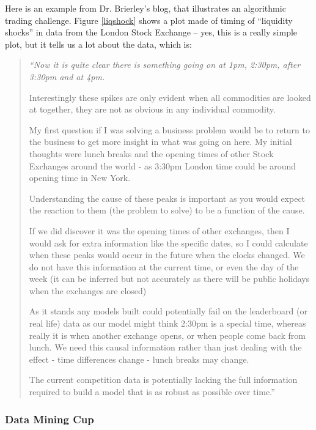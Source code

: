 \documentclass{article}
\begin{document}
Here is an example from Dr. Brierley's blog, that illustrates an algorithmic trading challenge. Figure \ref{liqshock} shows a plot made of timing of ``liquidity shocks'' in data from the London Stock Exchange -- yes, this is a really simple plot, but it tells us a lot about the data, which is:

\begin{quote}
{\em ``Now it is quite clear there is something going on at 1pm, 2:30pm, after 3:30pm and at 4pm.

Interestingly these spikes are only evident when all commodities are looked at together, they are not as obvious in any individual commodity.

My first question if I was solving a business problem would be to return to the business to get more insight in what was going on here. My initial thoughts were lunch breaks and the opening times of other Stock Exchanges around the world - as 3:30pm London time could be around opening time in New York.

Understanding the cause of these peaks is important as you would expect the reaction to them (the problem to solve) to be a function of the cause.

If we did discover it was the opening times of other exchanges, then I would ask for extra information like the specific dates, so I could calculate when these peaks would occur in the future when the clocks changed. We do not have this information at the current time, or even the day of the week (it can be inferred but not accurately as there will be public holidays when the exchanges are closed)

As it stands any models built could potentially fail on the leaderboard (or real life) data as our model might think 2:30pm is a special time, whereas really it is when another exchange opens, or when people come back from lunch. We need this causal information rather than just dealing with the effect - time differences change - lunch breaks may change.

The current competition data is potentially lacking the full information required to build a model that is as robust as possible over time.'' }
\end{quote}

\subsubsection{Data Mining Cup}
\end{document}

